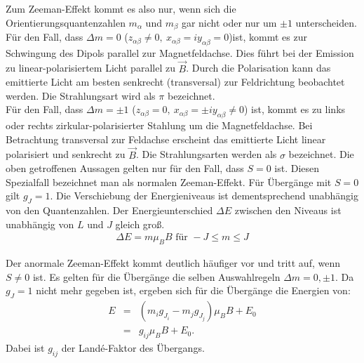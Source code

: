 Zum Zeeman-Effekt kommt es also nur, wenn sich die Orientierungsquantenzahlen $m_{\alpha}$ und $m_{\beta}$ gar nicht oder nur um $\pm 1$ unterscheiden.\\
%
Für den Fall, dass $\Delta m = 0$ ($z_{\alpha\beta} \neq 0,\ x_{\alpha\beta} = i y_{\alpha\beta} = 0$)ist, kommt es zur Schwingung des Dipols parallel zur Magnetfeldachse.
Dies führt bei der Emission zu linear-polarisiertem Licht parallel zu $\vec{B}$.
Durch die Polarisation kann das emittierte Licht am besten senkrecht (transversal) zur Feldrichtung beobachtet werden.
Die Strahlungsart wird als $\pi$ bezeichnet.\\
%
Für den Fall, dass $\Delta m = \pm 1$ ($z_{\alpha\beta} = 0,\ x_{\alpha\beta} = \pm i y_{\alpha\beta} \neq 0$) ist, kommt es zu links oder rechts zirkular-polarisierter Stahlung um die Magnetfeldachse.
Bei Betrachtung transversal zur Feldachse erscheint das emittierte Licht linear polarisiert und senkrecht zu $\vec{B}$.
Die Strahlungsarten werden als $\sigma$ bezeichnet.
%
Die oben getroffenen Aussagen gelten nur für den Fall, dass $S=0$ ist.
Diesen Spezialfall bezeichnet man als normalen Zeeman-Effekt.
Für Übergänge mit $S=0$ gilt $g_J = 1$.
Die Verschiebung der Energieniveaus ist dementsprechend unabhängig von den Quantenzahlen.
Der Energieunterschied $\Delta E$ zwischen den Niveaus ist unabhängig von $L$ und $J$ gleich groß.
\begin{align}
  \Delta E = m \mu_B B \text{ für } -J \leq m \leq J
  \label{eqn:normal}
\end{align}

Der anormale Zeeman-Effekt kommt deutlich häufiger vor und tritt auf, wenn $S \neq 0$ ist.
Es gelten für die Übergänge die selben Auswahlregeln $\Delta m = 0, \pm 1$.
Da $g_J = 1$ nicht mehr gegeben ist, ergeben sich für die Übergänge die Energien von:
\begin{align}
	E &=& (m_ig_{J_i}-m_jg_{J_j})\mu_BB+E_0
  \label{eqn:anormal}\\
    &=& g_{ij}\mu_BB + E_0.
    \label{eqn:allgemein}
\end{align}
Dabei ist $g_{ij}$ der Landé-Faktor des Übergangs.
\FloatBarrier

